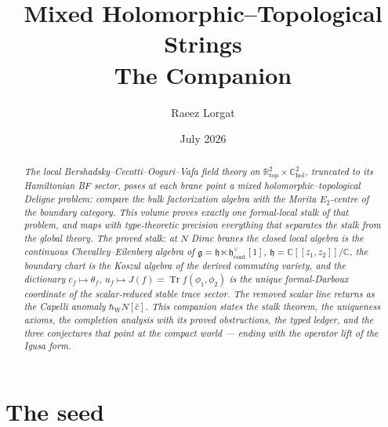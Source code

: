 \documentclass[11pt]{article}
\title{\bfseries Mixed Holomorphic--Topological Strings\\[0.4em]
\Large The Companion}
\author{Raeez Lorgat}
\date{July 2026}
\providecommand{\bC}{\mathbb{C}}
\providecommand{\bR}{\mathbb{R}}
\providecommand{\fg}{\mathfrak{g}}
\providecommand{\fh}{\mathfrak{h}}
\providecommand{\Tr}{\operatorname{Tr}}
\providecommand{\hbW}{\hbar_{\mathrm{W}}}
\begin{document}
\maketitle

\begin{abstract}
\noindent\itshape
The local Bershadsky--Cecotti--Ooguri--Vafa field theory on
$\bR^2_{\mathrm{top}}\times\bC^2_{\mathrm{hol}}$, truncated to its
Hamiltonian BF sector, poses at each brane point a mixed
holomorphic--topological Deligne problem: compare the bulk
factorization algebra with the Morita $E_2$-centre of the boundary
category. This volume proves exactly one formal-local stalk of that
problem, and maps with type-theoretic precision everything that
separates the stalk from the global theory. The proved stalk: at $N$
Dirac branes the closed local algebra is the continuous
Chevalley--Eilenberg algebra of
$\fg=\fh\ltimes\fh^\vee_{\mathrm{cont}}[1]$,
$\fh=\bC[[z_1,z_2]]/\bC$, the boundary chart is the Koszul algebra of
the derived commuting variety, and the dictionary
$c_f\mapsto\theta_f$, $u_f\mapsto J(f)=\Tr f(\phi_1,\phi_2)$ is the
unique formal-Darboux coordinate of the scalar-reduced stable trace
sector. The removed scalar line returns as the Capelli anomaly
$\hbW N[\bar c]$. This companion states the stalk theorem, the
uniqueness axioms, the completion analysis with its proved
obstructions, the typed ledger, and the three conjectures that point
at the compact world --- ending with the operator lift of the Igusa
form.
\end{abstract}

\section{The seed}\label{sec:seed}
\end{document}
